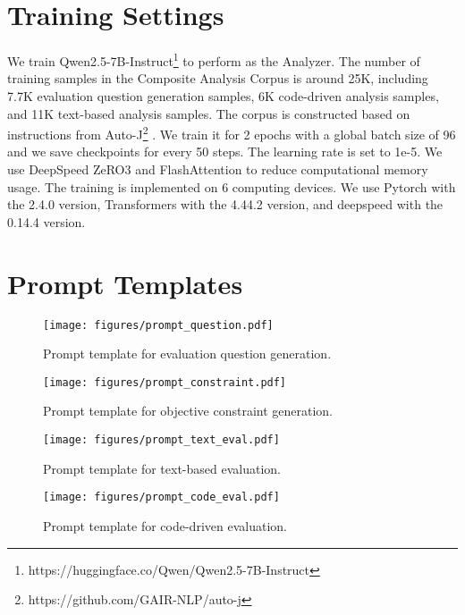 \section{Training Settings}\label{train_detail}

We train Qwen2.5-7B-Instruct\footnote{https://huggingface.co/Qwen/Qwen2.5-7B-Instruct} to perform as the Analyzer. The number of training samples in the Composite Analysis Corpus is around 25K, including 7.7K evaluation question generation samples, 6K code-driven analysis samples, and 11K text-based analysis samples. The corpus is constructed based on instructions from Auto-J\footnote{https://github.com/GAIR-NLP/auto-j} \cite{auto-j}. We train it for 2 epochs with a global batch size of 96 and we save checkpoints for every 50 steps. The learning rate is set to 1e-5. We use DeepSpeed ZeRO3 and FlashAttention to reduce computational memory usage. The training is implemented on 6 computing devices. We use Pytorch with the 2.4.0 version, Transformers with the 4.44.2 version, and deepspeed with the 0.14.4 version. 

\section{Prompt Templates}

\begin{figure*}[t!]
	\centering
	\texttt{[image: figures/prompt\_question.pdf]}
	\caption{Prompt template for evaluation question generation.}
	\label{prompt_question}
\end{figure*}

\begin{figure*}[t!]
	\centering
	\texttt{[image: figures/prompt\_constraint.pdf]}
	\caption{Prompt template for objective constraint generation.}
	\label{prompt_constraint}
\end{figure*}

\begin{figure*}[t!]
	\centering
	\texttt{[image: figures/prompt\_text\_eval.pdf]}
	\caption{Prompt template for text-based evaluation.}
	\label{prompt_text_eval}
\end{figure*}

\begin{figure*}[t!]
	\centering
	\texttt{[image: figures/prompt\_code\_eval.pdf]}
	\caption{Prompt template for code-driven evaluation.}
	\label{prompt_code_eval}
\end{figure*}

